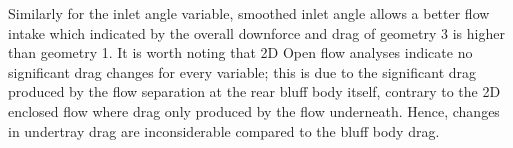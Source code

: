 \noindent Similarly for the inlet angle variable, smoothed inlet angle allows a better flow intake which indicated by the overall downforce and drag of geometry 3 is higher than geometry 1. It is worth noting that 2D Open flow analyses indicate no significant drag changes for every variable; this is due to the significant drag produced by the flow separation at the rear bluff body itself, contrary to the 2D enclosed flow where drag only produced by the flow underneath. Hence, changes in undertray drag are inconsiderable compared to the bluff body drag.



